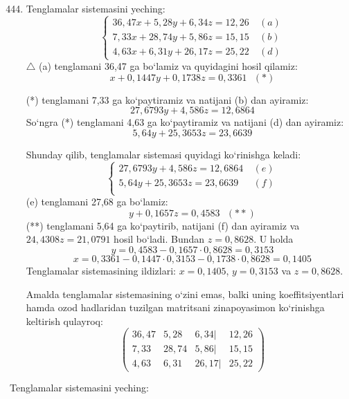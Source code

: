 \begin{enumerate}\setcounter{enumi}{443}
	\item Tenglamalar sistemasini yeching:
	$$\begin{cases}
		36,47x+5,28y+6,34z=12,26&\ (a)\\
		7,33x+28,74y+5,86z=15,15&\ (b)\\
		4,63x+6,31y+26,17z=25,22&\ (d)
	\end{cases}$$
$\triangle$ (a) tenglamani 36,47 ga bo`lamiz va quyidagini hosil qilamiz:
$$x+0,1447y+0,1738z=0,3361\ \ \ (*)$$

(*) tenglamani 7,33 ga ko`paytiramiz va natijani (b) dan ayiramiz:
$$27,6793y+4,586z=12,6864$$ 
So`ngra (*) tenglamani 4,63 ga ko`paytiramiz va natijani (d) dan ayiramiz:
$$5,64y+25,3653z=23,6639$$

Shunday qilib, tenglamalar sistemasi quyidagi ko`rinishga keladi:
$$\begin{cases}
	27,6793y+4,586z=12,6864&\ (e)\\
	5,64y+25,3653z=23,6639&\ (f)\\
\end{cases}$$
(e) tenglamani 27,68 ga bo`lamiz:
$$y+0,1657z=0,4583\ \ \ (**)$$
(**) tenglamani 5,64 ga ko`paytirib, natijani (f) dan ayiramiz va $24,4308z=21,0791$ hosil bo`ladi. Bundan $z=0,8628$. U holda 
$$y=0,4583-0,1657\cdot0,8628=0,3153$$
$$x=0,3361-0,1447\cdot0,3153-0,1738\cdot0,8628=0,1405$$
Tenglamalar sistemasining ildizlari: $x=0,1405$, $y=0,3153$ va $z=0,8628$. 

Amalda tenglamalar sistemasining o`zini emas, balki uning koeffitsiyentlari hamda ozod hadlaridan tuzilgan matritsani zinapoyasimon ko`rinishga keltirish qulayroq:
$$\begin{pmatrix}
36,47&5,28&6,34|&12,26\\
7,33&28,74&5,86|&15,15\\
4,63&6,31&26,17|&25,22
\end{pmatrix}
$$
\end{enumerate}
Tenglamalar sistemasini yeching:

